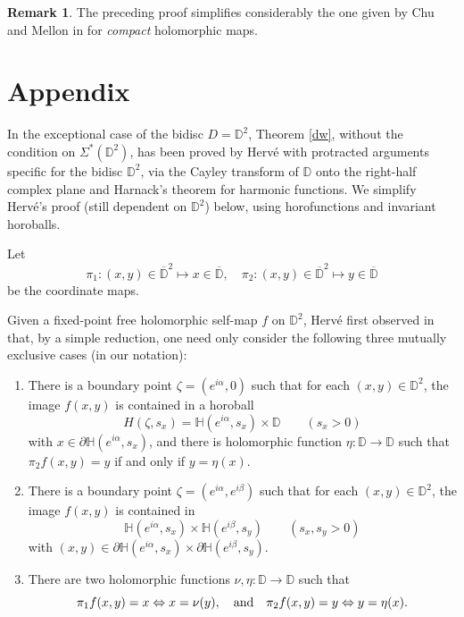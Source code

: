 \documentclass[12pt, twoside]{article}
\theoremstyle{definition}
\newtheorem*{xrem}{Remark}
\numberwithin{equation}{section}
\begin{document}
\begin{xrem} The preceding proof simplifies considerably the one given by Chu and Mellon in \cite[Theorem]{cm}
for {\it compact} holomorphic maps.
\end{xrem}

\section{Appendix}

In the exceptional  case of the bidisc $D=\mathbb{D}^2$, Theorem \ref{dw},
 without the condition on $\Sigma^*(\mathbb{D}^2)$,
has been proved by Herv\'e
\cite{h1} with protracted arguments specific for the bidisc  $\mathbb{D}^2$, via
the Cayley transform of $\mathbb{D}$ onto the right-half complex plane and Harnack's theorem
for harmonic functions.
We simplify Herv\'e's proof (still dependent on $\mathbb{D}^2$) below, using horofunctions and invariant horoballs.

Let
$$\pi_1: (x,y) \in \overline{\mathbb{D}}^2 \mapsto x\in \overline{\mathbb{D}}, \quad \pi_2: (x,y) \in
\overline{\mathbb{D}}^2 \mapsto y\in \overline{\mathbb{D}} $$
be the coordinate maps.

Given a fixed-point free
holomorphic self-map $f$ on $\mathbb{D}^2$, Herv\'e first observed in \cite[$7^0$]{h1} that, by a simple reduction,
one need only consider the following three mutually exclusive cases (in our notation):
\begin{enumerate}
\item[(a)] There is a boundary point $\zeta=(e^{i\alpha},0)$ such that for each
$(x,y)\in \mathbb{D}^2$, the image $f(x,y)$ is contained in a horoball
$$ H(\zeta, s_x)=\mathbb{H}(e^{i\alpha},s_x)\times \mathbb{D}\qquad (s_x >0)$$
 with $x\in \partial \mathbb{H}(e^{i\alpha},s_x)$,
 and there is holomorphic function $\eta: \mathbb{D}\longrightarrow \mathbb{D}$
such that $\pi_2f(x,y)=y$ if and only if $y=\eta(x)$.
\item[(b)] There is a boundary point $\zeta=(e^{i\alpha},e^{i\beta})$ such that for each
$(x,y)\in \mathbb{D}^2$, the image $ f(x,y)$ is contained in %
$$\mathbb{H}(e^{i\alpha},s_x) \times \mathbb{H}(e^{i\beta},s_y) \qquad (s_x, s_y >0)$$
with $(x,y) \in \partial \mathbb{H}(e^{i\alpha},s_x)\times \partial \mathbb{H}(e^{i\beta},s_y)$.
\item[(c)] There are two holomorphic functions $\nu, \eta: \mathbb{D}\longrightarrow \mathbb{D}$ such that
$$\pi_1f(x,y) = x \Leftrightarrow x= \nu(y), \quad {\rm and} \quad  \pi_2f(x,y) = y \Leftrightarrow y= \eta(x).$$
\end{enumerate}
\end{document}
